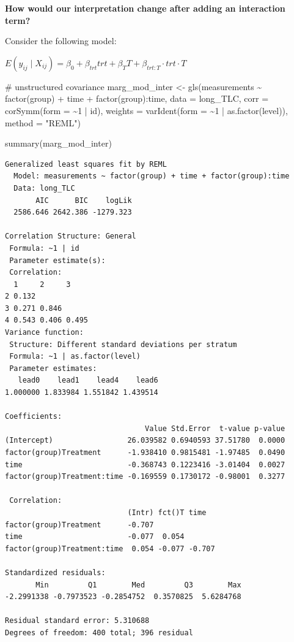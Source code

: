 \documentclass[
  letterpaper,
  DIV=11,
  numbers=noendperiod]{scrreprt}
\newenvironment{Shaded}{\begin{snugshade}}{\end{snugshade}}
\newcommand{\AttributeTok}[1]{\textcolor[rgb]{0.40,0.45,0.13}{#1}}
\newcommand{\CommentTok}[1]{\textcolor[rgb]{0.37,0.37,0.37}{#1}}
\newcommand{\DecValTok}[1]{\textcolor[rgb]{0.68,0.00,0.00}{#1}}
\newcommand{\FunctionTok}[1]{\textcolor[rgb]{0.28,0.35,0.67}{#1}}
\newcommand{\NormalTok}[1]{\textcolor[rgb]{0.00,0.23,0.31}{#1}}
\newcommand{\OtherTok}[1]{\textcolor[rgb]{0.00,0.23,0.31}{#1}}
\newcommand{\SpecialCharTok}[1]{\textcolor[rgb]{0.37,0.37,0.37}{#1}}
\newcommand{\StringTok}[1]{\textcolor[rgb]{0.13,0.47,0.30}{#1}}
\begin{document}
\textbf{How would our interpretation change after adding an interaction
term?}

Consider the following model:

\begin{center}
$E(y_{ij} \mid X_{ij}) = \beta_0 +  \beta_{trt}trt +  \beta_{T}T + \beta_{trt:T}\cdot trt \cdot T$ 
\end{center}

\begin{Shaded}
\begin{Highlighting}[]
\CommentTok{\# unstructured covariance}
\NormalTok{marg\_mod\_inter }\OtherTok{\textless{}{-}} \FunctionTok{gls}\NormalTok{(measurements }\SpecialCharTok{\textasciitilde{}} \FunctionTok{factor}\NormalTok{(group) }\SpecialCharTok{+}\NormalTok{ time }\SpecialCharTok{+} \FunctionTok{factor}\NormalTok{(group)}\SpecialCharTok{:}\NormalTok{time, }\AttributeTok{data =}\NormalTok{ long\_TLC,}
    \AttributeTok{corr =} \FunctionTok{corSymm}\NormalTok{(}\AttributeTok{form =} \SpecialCharTok{\textasciitilde{}}\DecValTok{1} \SpecialCharTok{|}\NormalTok{ id), }\AttributeTok{weights =} \FunctionTok{varIdent}\NormalTok{(}\AttributeTok{form =} \SpecialCharTok{\textasciitilde{}}\DecValTok{1} \SpecialCharTok{|} \FunctionTok{as.factor}\NormalTok{(level)),}
    \AttributeTok{method =} \StringTok{"REML"}\NormalTok{)}

\FunctionTok{summary}\NormalTok{(marg\_mod\_inter)}
\end{Highlighting}
\end{Shaded}

\begin{verbatim}
Generalized least squares fit by REML
  Model: measurements ~ factor(group) + time + factor(group):time 
  Data: long_TLC 
       AIC      BIC    logLik
  2586.646 2642.386 -1279.323

Correlation Structure: General
 Formula: ~1 | id 
 Parameter estimate(s):
 Correlation: 
  1     2     3    
2 0.132            
3 0.271 0.846      
4 0.543 0.406 0.495
Variance function:
 Structure: Different standard deviations per stratum
 Formula: ~1 | as.factor(level) 
 Parameter estimates:
   lead0    lead1    lead4    lead6 
1.000000 1.833984 1.551842 1.439514 

Coefficients:
                                Value Std.Error  t-value p-value
(Intercept)                 26.039582 0.6940593 37.51780  0.0000
factor(group)Treatment      -1.938410 0.9815481 -1.97485  0.0490
time                        -0.368743 0.1223416 -3.01404  0.0027
factor(group)Treatment:time -0.169559 0.1730172 -0.98001  0.3277

 Correlation: 
                            (Intr) fct()T time  
factor(group)Treatment      -0.707              
time                        -0.077  0.054       
factor(group)Treatment:time  0.054 -0.077 -0.707

Standardized residuals:
       Min         Q1        Med         Q3        Max 
-2.2991338 -0.7973523 -0.2854752  0.3570825  5.6284768 

Residual standard error: 5.310688 
Degrees of freedom: 400 total; 396 residual
\end{verbatim}
\end{document}
